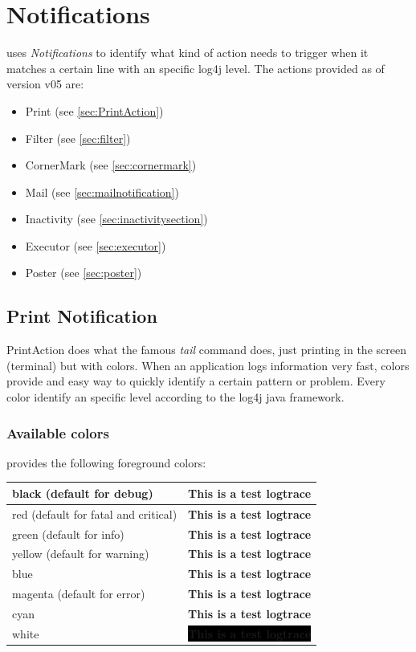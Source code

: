 \section{Notifications}
\logftailer{} uses \emph{Notifications} to identify what kind of action needs to
trigger when it matches a certain line with an specific log4j level. The actions
provided as of version v05 are:
\begin{itemize}
 \item Print (see \autoref{sec:PrintAction})
 \item Filter (see \autoref{sec:filter})
 \item CornerMark (see \autoref{sec:cornermark})
 \item Mail (see \autoref{sec:mailnotification})
 \item Inactivity (see \autoref{sec:inactivitysection})
 \item Executor (see \autoref{sec:executor})
 \item Poster (see \autoref{sec:poster})
\end{itemize}

\subsection{Print Notification}
\label{sec:PrintAction}PrintAction does what the famous \emph{tail} command does, just printing in the
screen (terminal) but with colors. When an application logs information very
fast, colors provide and easy way to quickly identify a certain pattern or
problem. Every color identify an specific level according to the log4j java
framework.

\subsubsection{Available colors}
\logftailer{} provides the following foreground colors:

\begin{center}
\begin{tabular}{|l || c|}
\hline
 black (default for debug) & {\color{black} \textbf{This is a test logtrace}} \\ 
\hline
 red (default for fatal and critical) & {\color{red} \textbf{This is a test logtrace}} \\ 
\hline
 green (default for info) & {\color{green} \textbf{This is a test logtrace}} \\ 
\hline
yellow (default for warning) & {\color{yellow} \textbf{This is a test logtrace}} \\ 
\hline
 blue & {\color{blue} \textbf{This is a test logtrace}} \\ 
\hline 
magenta (default for error) & {\color{magenta} \textbf{This is a test logtrace}} \\ 
\hline
 cyan & {\color{cyan} \textbf{This is a test logtrace}} \\ 
\hline 
white & \colorbox{black}{\color{white}\textbf{This is a test logtrace}} \\
\hline
\end{tabular}
\end{center}

